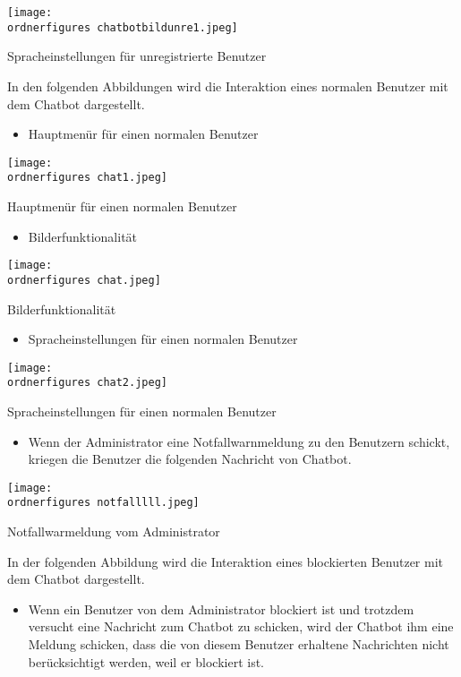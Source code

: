 \begin{center}
	\captionsetup{type=figure}
	\texttt{[image: \\ordnerfigures chatbotbildunre1.jpeg]}
	\caption{Spracheinstellungen f\"ur unregistrierte Benutzer}
	\label{fig:chatfd3}
\end{center}
In den folgenden Abbildungen wird die Interaktion eines normalen Benutzer mit dem Chatbot dargestellt.
\begin{itemize}
	\item Hauptmen\"ur f\"ur einen normalen Benutzer
\end{itemize}
\begin{center}
	\captionsetup{type=figure}
	\texttt{[image: \\ordnerfigures chat1.jpeg]}
	\caption{Hauptmen\"ur f\"ur einen normalen Benutzer} 
	\label{fig:chgtfd3}
\end{center}
\begin{itemize}
	\item Bilderfunktionalit\"at
\end{itemize}
\begin{center}
	\captionsetup{type=figure}
	\texttt{[image: \\ordnerfigures chat.jpeg]}
	\caption{Bilderfunktionalit\"at} 
	\label{fig:chgtf53}
\end{center}
\begin{itemize}
	\item Spracheinstellungen f\"ur einen normalen Benutzer
\end{itemize}
\begin{center}
	\captionsetup{type=figure}
	\texttt{[image: \\ordnerfigures chat2.jpeg]}
	\caption{Spracheinstellungen f\"ur einen normalen Benutzer} 
	\label{fig:chgtf43}
\end{center}
\begin{itemize}
	\item Wenn der Administrator eine Notfallwarnmeldung zu den Benutzern schickt, kriegen die Benutzer die folgenden Nachricht von Chatbot.
\end{itemize}
\begin{center}
	\captionsetup{type=figure}
	\texttt{[image: \\ordnerfigures notfalllll.jpeg]}
	\caption{Notfallwarmeldung vom Administrator} 
	\label{fig:chgf43}
\end{center}
In der folgenden Abbildung wird die Interaktion eines blockierten Benutzer mit dem Chatbot dargestellt.
\begin{itemize}
	\item Wenn ein Benutzer von dem Administrator blockiert ist und trotzdem versucht eine Nachricht zum Chatbot zu schicken, wird der Chatbot ihm eine Meldung schicken, dass die von diesem Benutzer erhaltene Nachrichten nicht ber\"ucksichtigt werden, weil er blockiert ist. 
\end{itemize}
